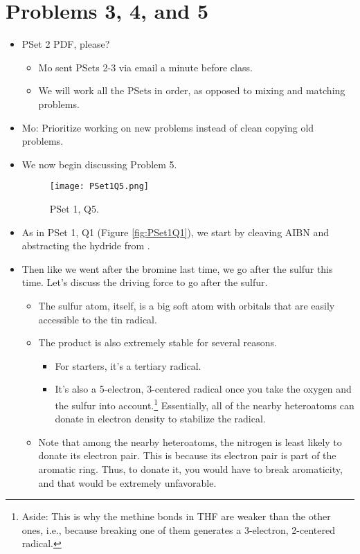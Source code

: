 \documentclass[../notes.tex]{subfiles}
\begin{document}
\section{Problems 3, 4, and 5}
\begin{itemize}
    \item {}PSet 2 PDF, please?
    \begin{itemize}
        \item Mo sent PSets 2-3 via email a minute before class.
        \item We will work all the PSets in order, as opposed to mixing and matching problems.
    \end{itemize}
    \item Mo: Prioritize working on new problems instead of clean copying old problems.
    \item We now begin discussing Problem 5.
    \begin{figure}[h!]
        \centering
        \texttt{[image: PSet1Q5.png]}
        \caption{PSet 1, Q5.}
        \label{fig:PSet1Q5}
    \end{figure}
    \item As in PSet 1, Q1 (Figure \ref{fig:PSet1Q1}), we start by cleaving AIBN and abstracting the hydride from .
    \item Then like we went after the bromine last time, we go after the sulfur this time. Let's discuss the driving force to go after the sulfur.
    \begin{itemize}
        \item The sulfur atom, itself, is a big soft atom with orbitals that are easily accessible to the tin radical.
        \item The product is also extremely stable for several reasons.
        \begin{itemize}
            \item For starters, it's a tertiary radical.
            \item It's also a 5-electron, 3-centered radical once you take the oxygen and the sulfur into account.\footnote{Aside: This is why the methine  bonds in THF are weaker than the other ones, i.e., because breaking one of them generates a 3-electron, 2-centered radical.} Essentially, all of the nearby heteroatoms can donate in electron density to stabilize the radical.
        \end{itemize}
        \item Note that among the nearby heteroatoms, the nitrogen is least likely to donate its electron pair. This is because its electron pair is part of the aromatic ring. Thus, to donate it, you would have to break aromaticity, and that would be extremely unfavorable.

\end{itemize}
\end{itemize}
\end{document}
